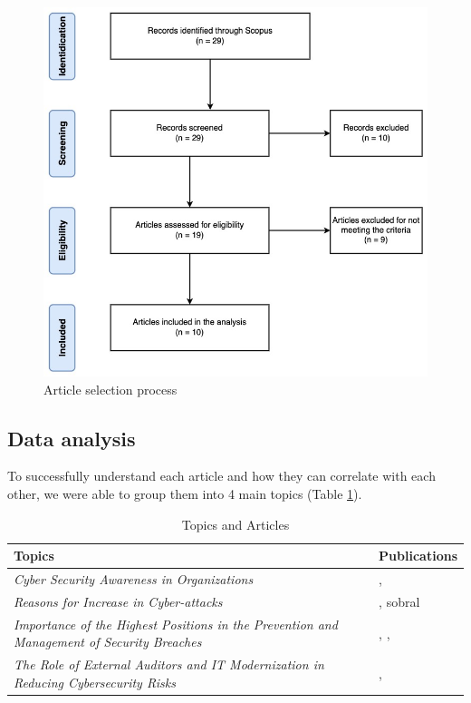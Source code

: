 \documentclass[journal]{IEEEtran}
\begin{document}
\begin{figure}[!h]
    \centering
    \caption{Article selection process}
    \label{articles}
    \includegraphics[width=\linewidth]{images/articles.jpg}
\end{figure}


\subsection{Data analysis}

To successfully understand each article and how they can correlate with each other, we were able to group them into 4 main topics (Table \ref{table_1}).

\begin{table}[h!]
    \renewcommand{\arraystretch}{1.3}
    \normalsize
    \caption{Topics and Articles}
    \label{table_1}
    \centering
    
    \begin{tabular}{ m{18em} m{5em} }
        \hline
        \textbf{Topics} & \textbf{Publications} \\
        \hline
        \textit{Cyber Security Awareness in Organizations} & \cite{Steps_article1}, \cite{Edu_article1} \\
        \hline
        \textit{Reasons for Increase in Cyber-attacks}   & \cite{Edu_article4}, sobral \\
        \hline
        \textit{Importance of the Highest Positions in the Prevention and Management of Security Breaches} & \cite{Steps_article3}, \cite{article3}, \cite{article11} \\
        \hline
        \textit{The Role of External Auditors and IT Modernization in Reducing Cybersecurity Risks} & \cite{bastos_1}, \cite{bastos_2} \\
        \hline
    \end{tabular}
    
\end{table}
\end{document}
